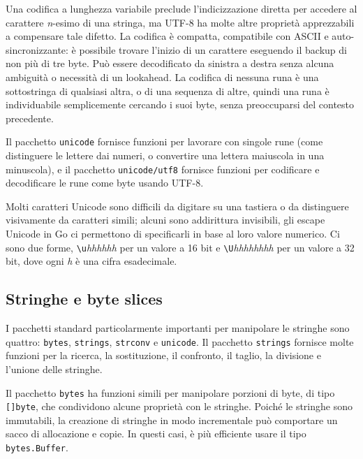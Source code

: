 Una codifica a lunghezza variabile preclude l'indicizzazione diretta per accedere al carattere \textit{n}-esimo di una stringa, ma UTF-8 ha molte altre proprietà apprezzabili a compensare tale difetto.
La codifica è compatta, compatibile con ASCII e auto-sincronizzante: è possibile trovare l'inizio di un carattere eseguendo il backup di non più di tre byte.
Può essere decodificato da sinistra a destra senza alcuna ambiguità o necessità di un lookahead.
La codifica di nessuna runa è una sottostringa di qualsiasi altra, o di una sequenza di altre, quindi una runa è individuabile semplicemente cercando i suoi byte, senza preoccuparsi del contesto precedente.

Il pacchetto \verb|unicode| fornisce funzioni per lavorare con singole rune (come distinguere le lettere dai numeri, o convertire una lettera maiuscola in una minuscola), e il pacchetto \verb|unicode/utf8| fornisce funzioni per codificare e decodificare le rune come byte usando UTF-8.

Molti caratteri Unicode sono difficili da digitare su una tastiera o da distinguere visivamente da caratteri simili;
alcuni sono addirittura invisibili, gli escape Unicode in Go ci permettono di specificarli in base al loro valore numerico.
Ci sono due forme, \verb|\u|\textit{hhhhhh} per un valore a 16 bit e \verb|\U|\textit{hhhhhhhh} per un valore a 32 bit, dove ogni \textit{h} è una cifra esadecimale.

\subsection{Stringhe e byte slices}
\label{subsec:stringhe_e_byte_slices}%
I pacchetti standard particolarmente importanti per manipolare le stringhe sono quattro: \verb|bytes|, \verb|strings|, \verb|strconv| e \verb|unicode|.
Il pacchetto \verb|strings| fornisce molte funzioni per la ricerca, la sostituzione, il confronto, il taglio, la divisione e l'unione delle stringhe.

Il pacchetto \verb|bytes| ha funzioni simili per manipolare porzioni di byte, di tipo \verb|[]byte|, che condividono alcune proprietà con le stringhe.
Poiché le stringhe sono immutabili, la creazione di stringhe in modo incrementale può comportare un sacco di allocazione e copie.
In questi casi, è più efficiente usare il tipo \verb|bytes.Buffer|.

